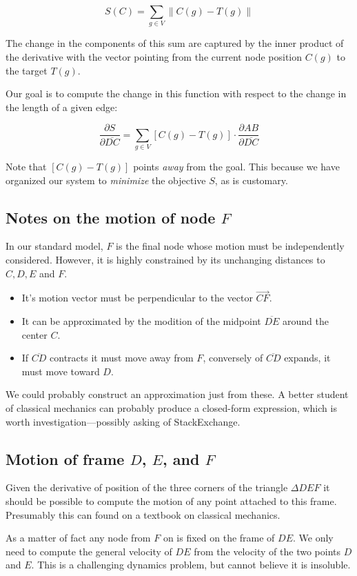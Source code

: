 \documentclass[11pt]{article}
\begin{document}
\[
S(C) = \sum_{g\in V} \| C(g) - T(g) \|
\]

The change in the components of this sum are captured by the inner product of the derivative with the vector
pointing from the current node position $C(g)$ to the target $T(g)$.

Our goal is to compute the change in this function with respect to the change in the length of a given edge:

\[
\frac{\partial S}{\partial \overline{DC}} =
\sum_{g\in V} [C(g) - T(g)] \cdot \frac{\partial AB }{\partial \overline{DC}} 
\]

Note that $[C(g) - T(g)]$ points {\em away} from the goal. This because we have organized our system to {\em minimize} the objective $S$,
as is customary.

\subsection{Notes on the motion of node $F$}

In our standard model, $F$ is the final node whose motion must be independently considered. However, it is highly constrained by
its unchanging distances to $C, D, E$ and $F$.
\begin{itemize}
\item It's motion vector must be perpendicular to the vector $\overrightarrow{CF}$.
\item It can be approximated by the modition of the midpoint $\overline{DE}$ around the center $C$.
\item If $\overline{CD}$ contracts it must move away from $F$, conversely of $\overline{CD}$ expands, it must move toward $D$.
\end{itemize}

We could probably construct an approximation just from these. A better student of classical mechanics can probably produce a
closed-form expression, which is worth investigation---possibly asking of StackExchange.

\subsection{Motion of frame $D$, $E$, and $F$}

Given the derivative of position of the three corners of the triangle $\Delta DEF$ it should be possible to
compute the motion of any point attached to this frame. Presumably this can found on a textbook on classical mechanics.

As a matter of fact any node from $F$ on is fixed on the frame of $DE$. We only need to compute the general velocity
of $DE$ from the velocity of the two points $D$ and $E$. This is a challenging dynamics problem, but cannot believe
it is insoluble.
\end{document}
